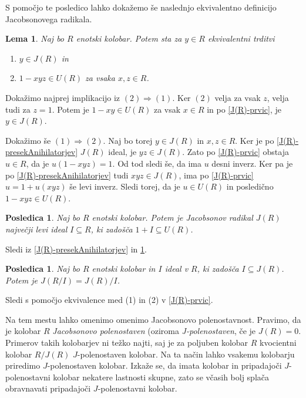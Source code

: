 \documentclass[a4paper, 12pt]{amsart}
\theoremstyle{definition} %
\theoremstyle{plain} %
\newtheorem{lema}[definicija]{Lema}
\newtheorem{posledica}[definicija]{Posledica}
\begin{document}
S pomočjo te posledico lahko dokažemo še naslednjo ekvivalentno definicijo Jacobsonovega radikala.

\begin{lema}
\label{J(R)-drugic}
Naj bo $R$ enotski kolobar. Potem sta za $y\in R$ ekvivalentni trditvi
\begin{enumerate}
\item $y\in J(R)$ in 
\item $1 - xyz \in U(R)$ za vsaka $x,z\in R$.
\end{enumerate}
\end{lema}

\proof
Dokažimo najprej implikacijo iz $(2) \Rightarrow (1)$. Ker $(2)$ velja za vsak $z$, velja tudi za $z=1$. Potem je $1- xy\in U(R)$ za vsak $x\in R$ in po \ref{J(R)-prvic}, je $y\in J(R)$. 

Dokažimo še $(1) \Rightarrow (2)$. Naj bo torej $y\in J(R)$ in $x,z\in R$. Ker je po \ref{J(R)-presekAnihilatorjev} $J(R)$ ideal, je $yz\in J(R)$. Zato po \ref{J(R)-prvic} obstaja $u\in R$, da je $u (1-xyz) = 1$. Od tod sledi še, da ima $u$ desni inverz. Ker pa je po \ref{J(R)-presekAnihilatorjev} tudi $xyz\in J(R)$, ima po \ref{J(R)-prvic}  $u = 1+ u(xyz)$ še levi inverz. Sledi torej, da je $u\in U(R)$ in posledično $1-xyz\in U(R)$.
\endproof

\begin{posledica}
Naj bo $R$ enotski kolobar. Potem je Jacobsonov radikal $J(R)$ največji levi ideal $I \subseteq R$, ki zadošča $1+I\subseteq U(R)$.
\end{posledica}

\proof
Sledi iz \ref{J(R)-presekAnihilatorjev} in \ref{J(R)-drugic}.
\endproof

\begin{posledica}
Naj bo $R$ enotski kolobar in $I$ ideal v $R$, ki zadošča $I\subseteq J(R)$. Potem je $J(R/I) = J(R)/I$.
\end{posledica}

\proof
Sledi s pomočjo ekvivalence med (1) in (2) v \ref{J(R)-prvic}.
\endproof

Na tem mestu lahko omenimo omenimo Jacobsonovo polenostavnost. Pravimo, da je kolobar $R$ \emph{Jacobsonovo polenostaven} (oziroma \emph{J-polenostaven}, če je $J(R) = 0$. Primerov takih kolobarjev ni težko najti, saj je za poljuben kolobar $R$ kvocientni kolobar $R/J(R)$ $J$-polenostaven kolobar. Na ta način lahko vsakemu kolobarju priredimo $J$-polenostaven kolobar. Izkaže se, da imata kolobar in pripadajoči $J$-polenostavni kolobar nekatere lastnosti skupne, zato se včasih bolj splača obravnavati pripadajoči $J$-polenostavni kolobar.
\end{document}
